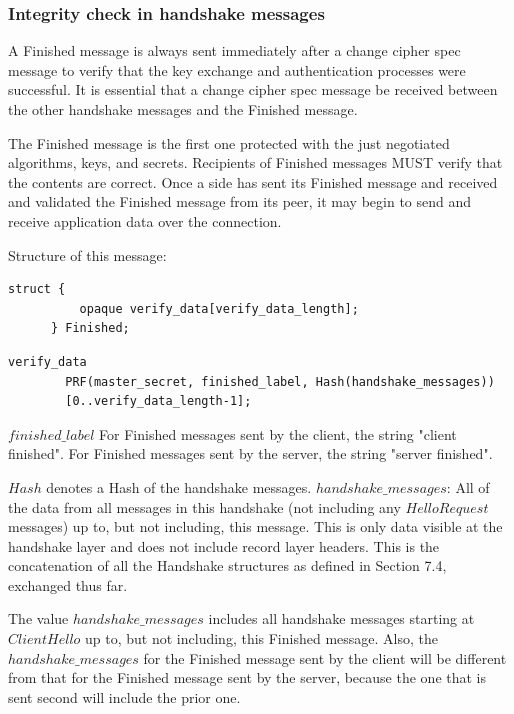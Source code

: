 \subsubsection{Integrity check in handshake messages}
A Finished message is always sent immediately after a change cipher spec message to verify that the key exchange and authentication processes were successful.  It is essential that a change cipher spec message be received between the other handshake messages and the Finished message.

The Finished message is the first one protected with the just negotiated algorithms, keys, and secrets.  Recipients of Finished messages MUST verify that the contents are correct.  Once a side has sent its Finished message and received and validated the Finished message from its peer, it may begin to send and receive application data over the connection.


Structure of this message:
\label{struct1}
\begin{lstlisting}
struct {
          opaque verify_data[verify_data_length];
      } Finished;

\end{lstlisting}      
     
\begin{lstlisting}
verify_data
        PRF(master_secret, finished_label, Hash(handshake_messages)) 
        [0..verify_data_length-1];

\end{lstlisting}    
      

\vspace{1cm}$finished\_label$
         For Finished messages sent by the client, the string
         "client finished".  For Finished messages sent by the server,
         the string "server finished".

$Hash$ denotes a Hash of the handshake messages.
$handshake\_messages$: All of the data from all messages in this handshake (not including any $HelloRequest$ messages) up to, but not including, this message.  This is only data visible at the handshake layer and does not include record layer headers.  This is the concatenation of all the Handshake structures as defined in Section 7.4, exchanged thus far.


The value $handshake\_messages$ includes all handshake messages starting at $ClientHello$ up to, but not including, this Finished message.  Also, the $handshake\_messages$ for the Finished message sent by the client will be different from that for the Finished message sent by the server, because the one that is sent second will include the prior one.

